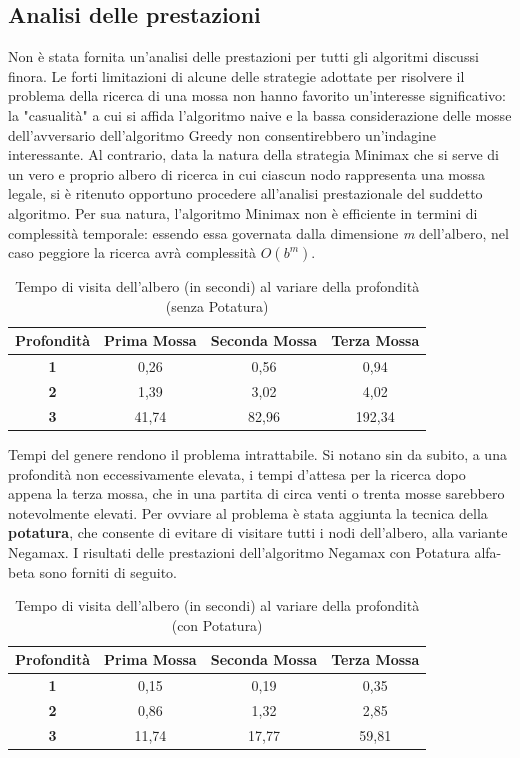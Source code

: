\subsection{Analisi delle prestazioni}
Non è stata fornita un'analisi delle prestazioni per tutti gli algoritmi discussi finora. Le forti limitazioni di alcune delle strategie adottate per risolvere il problema della ricerca di una mossa non hanno favorito un'interesse significativo: la "casualità" a cui si affida l'algoritmo naive e la bassa considerazione delle mosse dell'avversario dell'algoritmo Greedy non consentirebbero un'indagine interessante. Al contrario, data la natura della strategia Minimax che si serve di un vero e proprio albero di ricerca in cui ciascun nodo rappresenta una mossa legale, si è ritenuto opportuno procedere all'analisi prestazionale del suddetto algoritmo. Per sua natura, l'algoritmo Minimax non è efficiente in termini di complessità temporale: essendo essa governata dalla dimensione \textit{m} dell'albero, nel caso peggiore la ricerca avrà complessità $O(b^m)$.

\begin{table}[!htb]
    \centering
    \begin{tabular}{|c|c|c|c|}
\hline
\textbf{Profondità} & \textbf{Prima Mossa} & \textbf{Seconda Mossa} & \textbf{Terza Mossa}\\
\hline
\textbf{1} & 0,26 & 0,56 & 0,94\\
\hline
\textbf{2} & 1,39 & 3,02 & 4,02\\
\hline
\textbf{3} & 41,74 & 82,96 & 192,34\\
\hline
\end{tabular}
    \caption{Tempo di visita dell'albero (in secondi) al variare della profondità (senza Potatura)}
    \label{tab:my_label}
\end{table}

Tempi del genere rendono il problema intrattabile. Si notano sin da subito, a una profondità non eccessivamente elevata, i tempi d'attesa per la ricerca dopo appena la terza mossa, che in una partita di circa venti o trenta mosse sarebbero notevolmente elevati. Per ovviare al problema è stata aggiunta la tecnica della \textbf{potatura}, che consente di evitare di visitare tutti i nodi dell'albero, alla variante Negamax. I risultati delle prestazioni dell'algoritmo Negamax con Potatura alfa-beta sono forniti di seguito.

\begin{table}[!htb]
    \centering
    \begin{tabular}{|c|c|c|c|}
\hline
\textbf{Profondità} & \textbf{Prima Mossa} & \textbf{Seconda Mossa} & \textbf{Terza Mossa}\\
\hline
\textbf{1} & 0,15 & 0,19 & 0,35\\
\hline
\textbf{2} & 0,86 & 1,32 & 2,85\\
\hline
\textbf{3} & 11,74 & 17,77 & 59,81\\
\hline
\end{tabular}
    \caption{Tempo di visita dell'albero (in secondi) al variare della profondità (con Potatura)}
    \label{tab:my_label}
\end{table}

